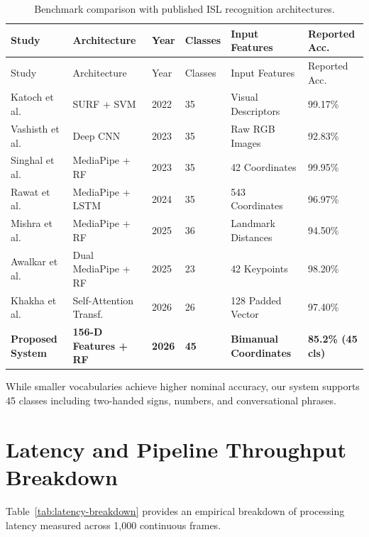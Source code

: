 \begin{longtable}{p{}p{}p{}p{}p{}p{}}
\caption{Benchmark comparison with published ISL recognition architectures.}\label{tab:comparative-benchmark}\\
\toprule Study & Architecture & Year & Classes & Input Features & Reported Acc.\\\midrule
\endfirsthead
\toprule Study & Architecture & Year & Classes & Input Features & Reported Acc.\\\midrule
\endhead
\bottomrule
\endfoot
Katoch et al. \cite{katoch2022} & SURF + SVM & 2022 & 35 & Visual Descriptors & 99.17\%\\
Vashisth et al. \cite{vashisth2023} & Deep CNN & 2023 & 35 & Raw RGB Images & 92.83\%\\
Singhal et al. \cite{singhal2023} & MediaPipe + RF & 2023 & 35 & 42 Coordinates & 99.95\%\\
Rawat et al. \cite{rawat2024} & MediaPipe + LSTM & 2024 & 35 & 543 Coordinates & 96.97\%\\
Mishra et al. \cite{mishra2025} & MediaPipe + RF & 2025 & 36 & Landmark Distances & 94.50\%\\
Awalkar et al. \cite{awalkar2025} & Dual MediaPipe + RF & 2025 & 23 & 42 Keypoints & 98.20\%\\
Khakha et al. \cite{khakha2026} & Self-Attention Transf. & 2026 & 26 & 128 Padded Vector & 97.40\%\\
\textbf{Proposed System} & \textbf{156-D Features + RF} & \textbf{2026} & \textbf{45} & \textbf{Bimanual Coordinates} & \textbf{85.2\% (45 cls)}\\
\end{longtable}

While smaller vocabularies achieve higher nominal accuracy, our system supports 45 classes including two-handed signs, numbers, and conversational phrases.

\section{Latency and Pipeline Throughput Breakdown}
Table~\ref{tab:latency-breakdown} provides an empirical breakdown of processing latency measured across 1,000 continuous frames.

